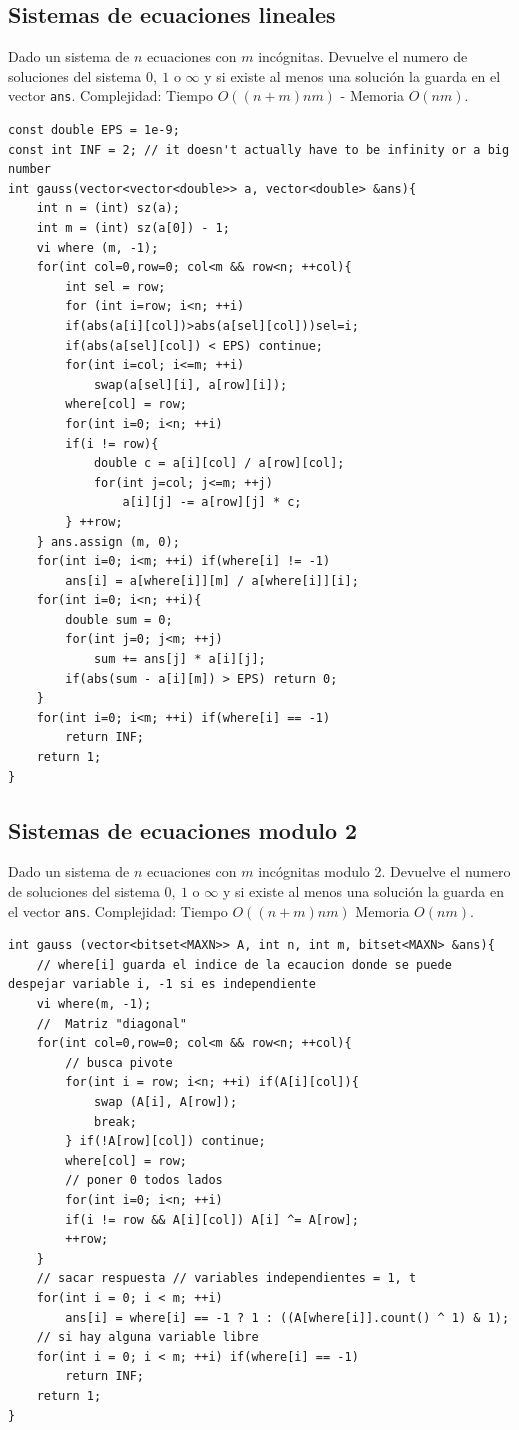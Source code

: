 \subsection{Sistemas de ecuaciones lineales }
Dado un sistema de $n$ ecuaciones  con $m$ incógnitas. Devuelve el numero de soluciones del sistema $0, \ 1 $ o $\infty$ y si existe al menos una solución la guarda en el vector \texttt{ans}. Complejidad: Tiempo $O(  (n+m)nm ) $ - Memoria $O(nm)$.
\begin{verbatim}
const double EPS = 1e-9;
const int INF = 2; // it doesn't actually have to be infinity or a big number
int gauss(vector<vector<double>> a, vector<double> &ans){
    int n = (int) sz(a);
    int m = (int) sz(a[0]) - 1;
    vi where (m, -1);
    for(int col=0,row=0; col<m && row<n; ++col){
        int sel = row;
        for (int i=row; i<n; ++i)
        if(abs(a[i][col])>abs(a[sel][col]))sel=i;
        if(abs(a[sel][col]) < EPS) continue;
        for(int i=col; i<=m; ++i)
            swap(a[sel][i], a[row][i]);
        where[col] = row;
        for(int i=0; i<n; ++i)
        if(i != row){
            double c = a[i][col] / a[row][col];
            for(int j=col; j<=m; ++j)
                a[i][j] -= a[row][j] * c;
        } ++row;
    } ans.assign (m, 0);
    for(int i=0; i<m; ++i) if(where[i] != -1)
        ans[i] = a[where[i]][m] / a[where[i]][i];
    for(int i=0; i<n; ++i){
        double sum = 0;
        for(int j=0; j<m; ++j)
            sum += ans[j] * a[i][j];
        if(abs(sum - a[i][m]) > EPS) return 0;
    }
    for(int i=0; i<m; ++i) if(where[i] == -1)
        return INF;
    return 1;
}
\end{verbatim}



\subsection{Sistemas de ecuaciones modulo 2}
Dado un sistema de $n$ ecuaciones  con $m$ incógnitas modulo 2. Devuelve el numero de soluciones del sistema $0, \ 1 $ o $\infty$ y si existe al menos una solución la guarda en el vector \texttt{ans}. Complejidad: Tiempo $O((n+m)nm) $  Memoria $O(nm)$.
\begin{verbatim}
int gauss (vector<bitset<MAXN>> A, int n, int m, bitset<MAXN> &ans){
    // where[i] guarda el indice de la ecaucion donde se puede despejar variable i, -1 si es independiente
    vi where(m, -1);
    //  Matriz "diagonal"
    for(int col=0,row=0; col<m && row<n; ++col){
        // busca pivote
        for(int i = row; i<n; ++i) if(A[i][col]){
            swap (A[i], A[row]);
            break;
        } if(!A[row][col]) continue;
        where[col] = row;
        // poner 0 todos lados
        for(int i=0; i<n; ++i)
        if(i != row && A[i][col]) A[i] ^= A[row];
        ++row;
    }
    // sacar respuesta // variables independientes = 1, t
    for(int i = 0; i < m; ++i)
        ans[i] = where[i] == -1 ? 1 : ((A[where[i]].count() ^ 1) & 1);
    // si hay alguna variable libre
    for(int i = 0; i < m; ++i) if(where[i] == -1)
        return INF;
    return 1;
}
\end{verbatim}